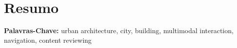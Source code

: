 \chapter*{Resumo}


\textbf{Palavras-Chave:} urban architecture, city, building, multimodal interaction, navigation, content reviewing
